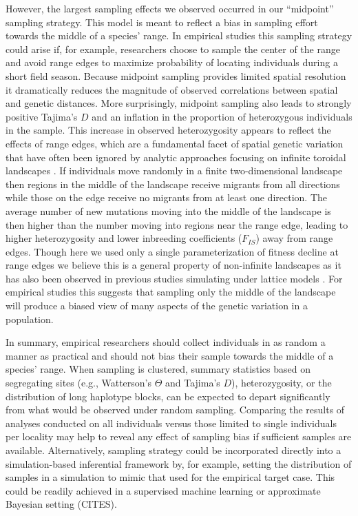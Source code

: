 \documentclass[11pt,twoside,lineno]{preprint}
\begin{document}
However, the largest sampling effects we observed occurred in our ``midpoint'' sampling strategy. This model is meant to reflect a bias in sampling effort towards the middle of a species' range. In empirical studies this sampling strategy could arise if, for example, researchers choose to sample the center of the range and avoid range edges to maximize probability of locating individuals during a short field season. Because midpoint sampling provides limited spatial resolution it dramatically reduces the magnitude of observed correlations between spatial and genetic distances. More surprisingly, midpoint sampling also leads to strongly positive Tajima's $D$ and an inflation in the proportion of heterozygous individuals in the sample. This increase in observed heterozygosity appears to reflect the effects of range edges, which are a fundamental facet of spatial genetic variation that have often been ignored by analytic approaches focusing on infinite toroidal landscapes \citep{Felsenstein1975}. If individuals move randomly in a finite two-dimensional landscape then regions in the middle of the landscape receive migrants from all directions while those on the edge receive no migrants from at least one direction. The average number of new mutations moving into the middle of the landscape is then higher than the number moving into regions near the range edge, leading to higher heterozygosity and lower inbreeding coefficients ($F_{IS}$) away from range edges. Though here we used only a single parameterization of fitness decline at range edges we believe this is a general property of non-infinite landscapes as it has also been observed in previous studies simulating under lattice models \citep{Neel2013,Shirk2014}. For empirical studies this suggests that sampling only the middle of the landscape will produce a biased view of many aspects of the genetic variation in a population. 

In summary, empirical researchers should collect individuals in as random a manner as practical and should not bias their sample towards the middle of a species' range. When sampling is clustered, summary statistics based on segregating sites (e.g., Watterson's $\Theta$ and Tajima's $D$), heterozygosity, or the distribution of long haplotype blocks, can be expected to depart significantly from what would be observed under random sampling. Comparing the results of analyses conducted on all individuals versus those limited to single individuals per locality may help to reveal any effect of sampling bias if sufficient samples are available. Alternatively, sampling strategy could be incorporated directly into a simulation-based inferential framework by, for example, setting the  distribution of samples in a simulation to mimic that used for the empirical target case. This could be readily achieved in a supervised machine learning or approximate Bayesian setting (CITES).
\end{document}
